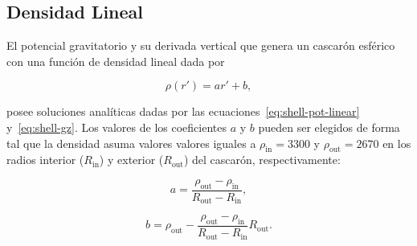 \subsection{Densidad Lineal}

El potencial gravitatorio y su derivada vertical que genera un cascarón
esférico con una función de densidad lineal dada por

\begin{equation}
    \rho(r') = ar' + b,
    \label{eq:density-linear}
\end{equation}

\noindent posee soluciones analíticas dadas por las
ecuaciones~\ref{eq:shell-pot-linear} y~\ref{eq:shell-gz}. Los valores de los
coeficientes $a$ y $b$ pueden ser elegidos de forma tal que la densidad asuma
valores valores iguales a  $\rho_\text{in} = 3300$\kgpercubicm{} y
$\rho_\text{out} = 2670$\kgpercubicm{} en los radios interior ($R_\text{in}$)
y exterior ($R_\text{out}$) del cascarón, respectivamente:

\begin{equation}
    a = \frac{\rho_\text{out} - \rho_\text{in}}{R_\text{out} - R_\text{in}},
\end{equation}

\begin{equation}
    b = \rho_\text{out} -
    \frac{
        \rho_\text{out} - \rho_\text{in}
    }{
        R_\text{out} - R_\text{in}
    } R_\text{out}.
\end{equation}


